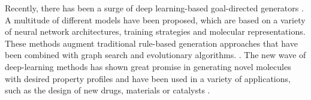Recently, there has been a surge of deep learning-based goal-directed generators
\citep{eltonDeepLearningMolecular2019,sanchez-lengelingInverseMolecularDesign2018,duMachineLearningaidedGenerative2024}.
A multitude of different models have been proposed, which are based on a variety of neural network
architectures, training strategies and molecular representations. These methods augment traditional
rule-based generation approaches that have been combined with graph search and evolutionary
algorithms. \citep{schneiderComputerbasedNovoDesign2005,schneiderNovoMolecularDesign2013}. The new
wave of deep-learning methods has shown great promise in generating novel molecules with desired
property profiles and have been used in a variety of applications, such as the design of new drugs,
materials or catalysts \citep{todo}.

